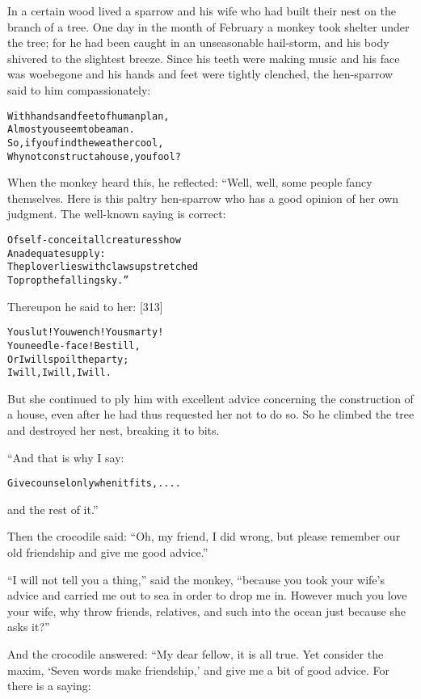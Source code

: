 \documentclass{article}
\renewenvironment{verbatim}{\begin{alltt}\normalfont\begin{centering}}{\end{centering}\end{alltt}}
\begin{document}
In a certain wood lived a sparrow and his wife who had built their
nest on the branch of a tree. One day in the month of February a
monkey took shelter under the tree; for he had been caught in an
unseasonable hail-storm, and his body shivered to the slightest
breeze. Since his teeth were making music and his face was
woebegone and his hands and feet were tightly clenched, the
hen-sparrow said to him compassionately:

\begin{verbatim}
With hands and feet of human plan,
Almost you seem to be a man.
So, if you find the weather cool,
Why not construct a house, you fool?
\end{verbatim}
When the monkey heard this, he reflected: “Well, well, some people
fancy themselves. Here is this paltry hen-sparrow who has a good
opinion of her own judgment. The well-known saying is correct:

\begin{verbatim}
Of self-conceit all creatures show
    An adequate supply:
The plover lies with claws upstretched
    To prop the falling sky.”
\end{verbatim}
Thereupon he said to her: [313]

\begin{verbatim}
You slut! You wench! You smarty!
    You needle-face! Be still,
Or I will spoil the party;
    I will, I will, I will.
\end{verbatim}
But she continued to ply him with excellent advice concerning the
construction of a house, even after he had thus requested her not
to do so. So he climbed the tree and destroyed her nest, breaking
it to bits.

“And that is why I say:

\begin{verbatim}
Give counsel only when it fits, ....
\end{verbatim}
and the rest of it.”

Then the crocodile said:
``Oh, my friend, I did wrong, but please remember our old friendship and give me good advice.''

``I will not tell you a thing,'' said the monkey,
``because you took your wife's advice and carried me out to sea in order to drop me in. However much you love your wife, why throw friends, relatives, and such into the ocean just because she asks it?''

And the crocodile answered: “My dear fellow, it is all true. Yet
consider the maxim, `Seven words make friendship,' and give me a
bit of good advice. For there is a saying:
\end{document}
